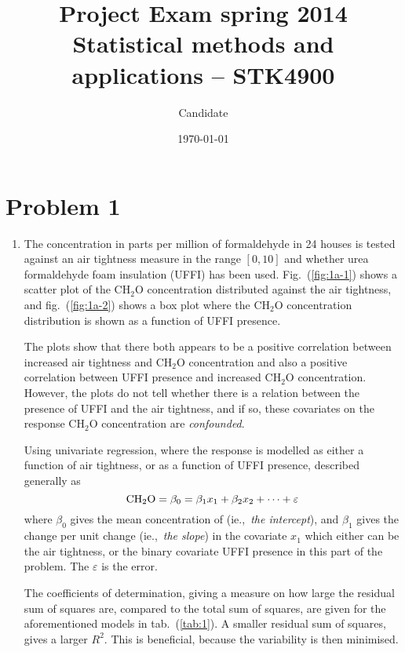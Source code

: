 \documentclass[a4paper,11pt]{article}
\date{\today}
\title{Project Exam spring 2014\\ \small{Statistical methods and applications -- STK4900}}
\author{Candidate}
\newcommand{\CHHO}{\text{CH\ensuremath{_2}O} }
\begin{document}
\onecolumn
\maketitle{}


\section*{Problem 1}

\begin{enumerate}[label=\alph*)]
    \item The concentration in parts per million of formaldehyde in 24 houses is tested against an air tightness measure in the range $[0,10]$ and whether urea formaldehyde foam insulation (UFFI) has been used. Fig.~(\ref{fig:1a-1}) shows a scatter plot of the CH$_2$O concentration distributed against the air tightness, and fig.~(\ref{fig:1a-2}) shows a box plot where the CH$_2$O concentration distribution is shown as a function of UFFI presence. 

        The plots show that there both appears to be a positive correlation between increased air tightness and CH$_2$O concentration and also a positive correlation between UFFI presence and increased CH$_2$O concentration. However, the plots do not tell whether there is a relation between the presence of UFFI and the air tightness, and if so, these covariates on the response CH$_2$O concentration are \textit{confounded}. 

        Using univariate regression, where the response \CHHO is modelled as either a function of air tightness, or as a function of UFFI presence, described generally as
        \begin{equation}
            {\rm CH_2O} = \beta_0 = \beta_1 x_1 + \beta_2 x_2 + \dots + \varepsilon
            \label{eq:linmod}
        \end{equation}
        where $\beta_0$ gives the mean concentration of \CHHO (ie.,~\textit{the intercept}), and $\beta_1$ gives the change per unit change (ie.,~\textit{the slope}) in the covariate $x_1$ which either can be the air tightness, or the binary covariate UFFI presence in this part of the problem. The $\varepsilon$ is the error. 

        The coefficients of determination, giving a measure on how large the residual sum of squares are, compared to the total sum of squares, are given for the aforementioned models in tab.~(\ref{tab:1}). A smaller residual sum of squares, gives a larger $R^2$.  This is beneficial, because the variability is then minimised.


\end{enumerate}
\end{document}
